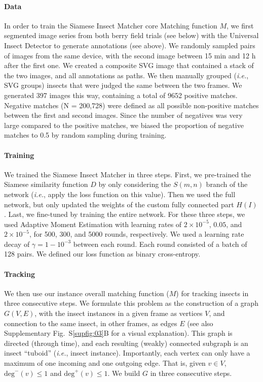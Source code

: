 \documentclass[12pt]{article}
\begin{document}
\begin{linenumbers}
		\paragraph{Data}
		In order to train the Siamese Insect Matcher core Matching function $M$, we first segmented image series from both berry field trials (see below) with the Universal Insect Detector to generate annotations (see above). We randomly sampled pairs of images from the same device, with the second image between 15 min and 12 h after the first one. We created a composite SVG image that contained a stack of the two images, and all annotations as paths. We then manually grouped (\emph{i.e.}, SVG groups) insects that were judged the same between the two frames. We generated 397 images this way, containing a total of 9652 
		positive matches. Negative matches (N = 200,728) were defined as all possible non-positive matches between the first and second images. Since the number of negatives was very large compared to the positive matches, we biased the proportion of negative matches to 0.5 by random sampling during training.
		
		\paragraph{Training}
		We trained the Siamese Insect Matcher in three steps. First, we pre-trained the Siamese similarity function $D$ by only considering the $S(m,n)$ branch of the network (\emph{i.e.}, apply the loss function on this value). Then we used the full network, but only updated the weights of the custom fully connected part $H(I)$. Last, we fine-tuned by training the entire network. For these three steps, we used Adaptive Moment Estimation with learning rates of $2\times{}10^{-5}$, $0.05$, and $2\times{}10^{-5}$, for 500, 300, and 5000 rounds, respectively. We used a learning rate decay of $\gamma = 1- 10^{-3}$ between each round. Each round consisted of a batch of 128 pairs. We defined our loss function as binary cross-entropy.
		
		\paragraph{Tracking}
		We then use our instance overall matching function ($M$) for tracking insects in three consecutive steps. We formulate this problem as the construction of a graph $G(V, E)$, with the insect instances in a given frame as vertices $V$, and connection to the same insect, in other frames, as edges $E$ (see also Supplementary Fig.~S\ref{supfig:03}B for a visual explanation). This graph is directed (through time), and each resulting (weakly) connected subgraph is an insect “tuboid” (\emph{i.e.}, insect instance). Importantly, each vertex can only have a maximum of one incoming and one outgoing edge. That is, given $v \in V$, $\text{deg}^-(v) \le 1$ and $\text{deg}^+(v) \le 1$. We build $G$ in three consecutive steps. 
		

\end{linenumbers}
\end{document}
